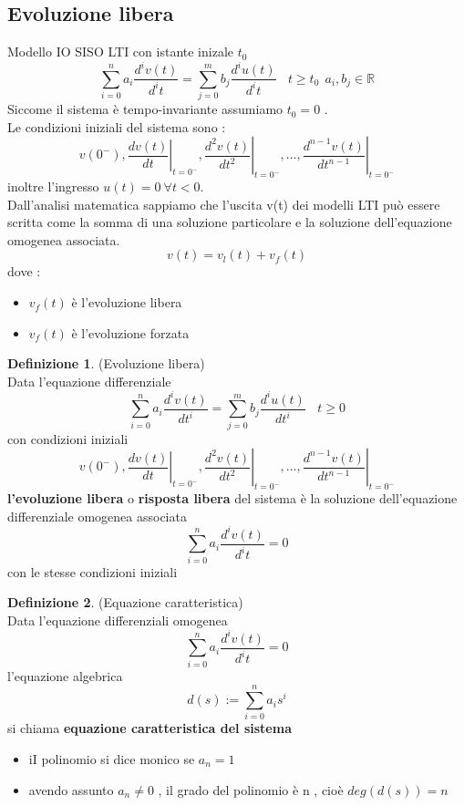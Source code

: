 \documentclass{article}
\theoremstyle{definition}
\newtheorem*{definizione}{Definizione}
\newcommand{\R}{\mathbb{R}}
\begin{document}
\subsection{Evoluzione libera}
Modello IO SISO LTI con istante inizale $t_0$
$$\sum_{i=0}^{n}a_i \frac{d^i v(t)}{d^it}=\sum_{j=0}^{m}b_j \frac{d^i u(t)}{d^it}  \ \ \ \ t \geq t_0\ \ a_i,b_j \in \R	$$
Siccome il sistema è tempo-invariante assumiamo $t_0=0$ .\\Le condizioni iniziali del sistema sono : 
$$v\left(0^{-}\right),\left.\frac{d v(t)}{d t}\right|_{t=0^{-}},\left.\frac{d^2 v(t)}{d t^2}\right|_{t=0^{-}}, \ldots,\left.\frac{d^{n-1} v(t)}{d t^{n-1}}\right|_{t=0^{-}}
$$
inoltre l'ingresso $u(t)=0 \ \forall t < 0$.\\Dall'analisi matematica sappiamo che l'uscita v(t) dei modelli LTI può essere scritta come la somma di una soluzione particolare e la soluzione dell'equazione omogenea associata.
$$v(t)=v_l(t)+v_f(t)$$
dove : 
\begin{itemize}
	\item $v_f(t)$ è l'evoluzione libera 
	\item $v_f(t)$ è l'evoluzione forzata 
\end{itemize}
\begin{definizione}(Evoluzione libera)\\
	Data l'equazione differenziale
	$$\sum_{i=0}^{n}a_i \frac{d^i v(t)}{dt^i}=\sum_{j=0}^{m}b_j \frac{d^i u(t)}{dt^i}  \ \ \ \ t \geq 0$$ con condizioni iniziali $$v\left(0^{-}\right),\left.\frac{d v(t)}{d t}\right|_{t=0^{-}},\left.\frac{d^2 v(t)}{d t^2}\right|_{t=0^{-}}, \ldots,\left.\frac{d^{n-1} v(t)}{d t^{n-1}}\right|_{t=0^{-}}
	$$ \textbf{l'evoluzione libera } o \textbf{risposta libera} del sistema è la soluzione dell'equazione differenziale omogenea associata 
	$$\sum_{i=0}^{n}a_i \frac{d^i v(t)}{d^it}=0$$ con le stesse condizioni iniziali
\end{definizione}
\begin{definizione}(Equazione caratteristica)\\
	Data l'equazione differenziali omogenea
	$$\sum_{i=0}^{n}a_i \frac{d^i v(t)}{d^it}=0$$
	l'equazione algebrica 
	$$d(s):= \sum_{i=0}^{n}a_i s^i$$
	si chiama \textbf{equazione caratteristica del sistema }
	\begin{itemize}
		\item iI polinomio si dice monico se $a_n=1$
		\item avendo assunto $a_n \neq 0$ , il grado del polinomio è n , cioè $deg(d(s))=n$
	\end{itemize}
\end{definizione}
\end{document}
